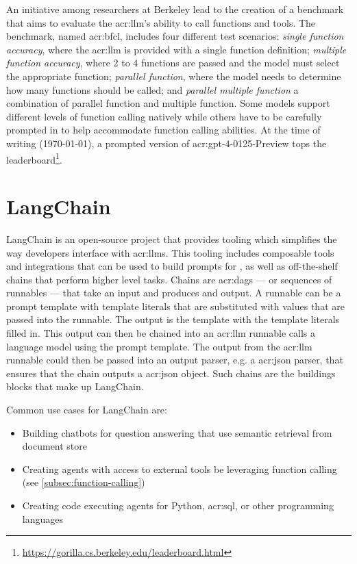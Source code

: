 An initiative among researchers at Berkeley \citep{yanfanjiaBerkeleyFunctionCalling} lead to the creation of a benchmark that aims to evaluate the \acrshort{acr:llm}'s ability to call functions and tools. The benchmark, named \gls{acr:bfcl}, includes four different test scenarios: \textit{single function accuracy}, where the \acrshort{acr:llm} is provided with a single function definition; \textit{multiple function accuracy}, where 2 to 4 functions are passed and the model must select the appropriate function; \textit{parallel function}, where the model needs to determine how many functions should be called; and \textit{parallel multiple function} a combination of parallel function and multiple function. Some models support different levels of function calling natively while others have to be carefully prompted in to help accommodate function calling abilities. At the time of writing (\today), a prompted version of \acrshort{acr:gpt}-4-0125-Preview tops the leaderboard\footnote{\url{https://gorilla.cs.berkeley.edu/leaderboard.html}}.

\section{LangChain}
\label{sec:langchain}

LangChain \citep{langchainaiLangchainaiLangchain2022} is an open-source project that provides tooling which simplifies the way developers interface with \glspl{acr:llm}. This tooling includes composable tools and integrations that can be used to build prompts for , as well as off-the-shelf chains that perform higher level tasks. Chains are \glspl{acr:dag} --- or sequences of runnables --- that take an input and produces and output. A runnable can be a prompt template with template literals that are substituted with values that are passed into the runnable. The output is the template with the template literals filled in. This output can then be chained into an \acrshort{acr:llm} runnable calls a language model using the prompt template. The output from the \acrshort{acr:llm} runnable could then be passed into an output parser, e.g. a \acrshort{acr:json} parser, that ensures that the chain outputs a \acrshort{acr:json} object. Such chains are the buildings blocks that make up LangChain.

Common use cases for LangChain are:

\begin{itemize}
    \item Building chatbots for question answering that use semantic retrieval from document store
    \item Creating agents with access to external tools be leveraging function calling (see \autoref{subsec:function-calling})
    \item Creating code executing agents for Python, \acrshort{acr:sql}, or other programming languages
\end{itemize}


